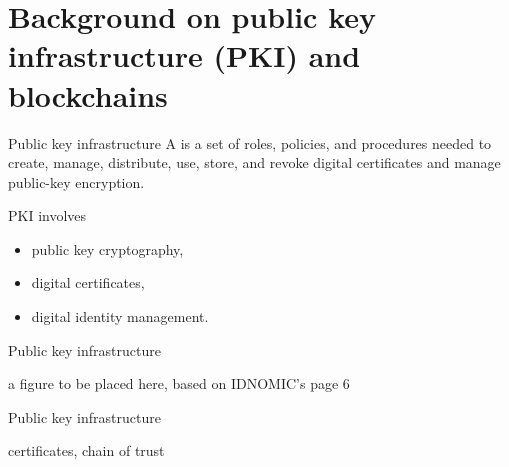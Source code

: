 \section[PKI and blockchains]{Background on public key infrastructure (PKI) and blockchains}

\begin{frame}{Public key infrastructure}
A  is a set of roles, policies, and procedures needed to create, manage, distribute, use, store, and revoke digital certificates and manage public-key encryption.

\vspace{2mm}

PKI involves
\begin{itemize}
\item public key cryptography,
\item digital certificates,
\item digital identity management.
\end{itemize}

\end{frame}


\begin{frame}{Public key infrastructure}
\begin{figure}[t]
\end{figure}

a figure to be placed here, based on IDNOMIC's page 6
\end{frame}


\begin{frame}{Public key infrastructure}

certificates, chain of trust

\end{frame}

